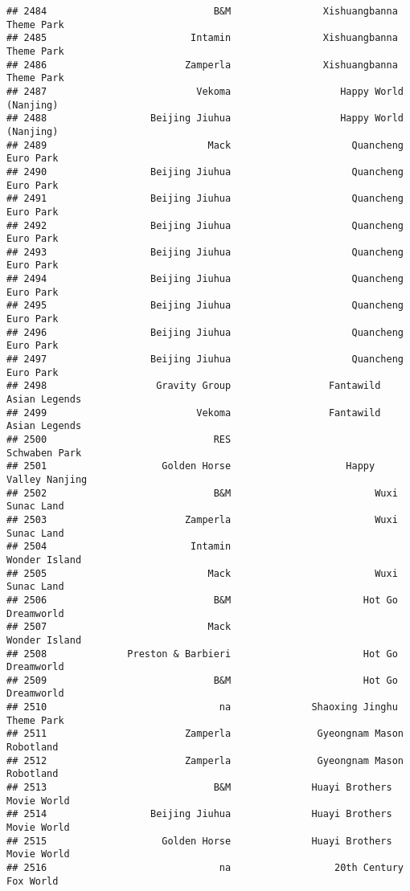 \documentclass[
]{article}
\begin{document}
\begin{verbatim}
## 2484                             B&M                Xishuangbanna Theme Park
## 2485                         Intamin                Xishuangbanna Theme Park
## 2486                        Zamperla                Xishuangbanna Theme Park
## 2487                          Vekoma                   Happy World (Nanjing)
## 2488                  Beijing Jiuhua                   Happy World (Nanjing)
## 2489                            Mack                     Quancheng Euro Park
## 2490                  Beijing Jiuhua                     Quancheng Euro Park
## 2491                  Beijing Jiuhua                     Quancheng Euro Park
## 2492                  Beijing Jiuhua                     Quancheng Euro Park
## 2493                  Beijing Jiuhua                     Quancheng Euro Park
## 2494                  Beijing Jiuhua                     Quancheng Euro Park
## 2495                  Beijing Jiuhua                     Quancheng Euro Park
## 2496                  Beijing Jiuhua                     Quancheng Euro Park
## 2497                  Beijing Jiuhua                     Quancheng Euro Park
## 2498                   Gravity Group                 Fantawild Asian Legends
## 2499                          Vekoma                 Fantawild Asian Legends
## 2500                             RES                           Schwaben Park
## 2501                    Golden Horse                    Happy Valley Nanjing
## 2502                             B&M                         Wuxi Sunac Land
## 2503                        Zamperla                         Wuxi Sunac Land
## 2504                         Intamin                           Wonder Island
## 2505                            Mack                         Wuxi Sunac Land
## 2506                             B&M                       Hot Go Dreamworld
## 2507                            Mack                           Wonder Island
## 2508              Preston & Barbieri                       Hot Go Dreamworld
## 2509                             B&M                       Hot Go Dreamworld
## 2510                              na              Shaoxing Jinghu Theme Park
## 2511                        Zamperla               Gyeongnam Mason Robotland
## 2512                        Zamperla               Gyeongnam Mason Robotland
## 2513                             B&M              Huayi Brothers Movie World
## 2514                  Beijing Jiuhua              Huayi Brothers Movie World
## 2515                    Golden Horse              Huayi Brothers Movie World
## 2516                              na                  20th Century Fox World

\end{verbatim}
\end{document}
